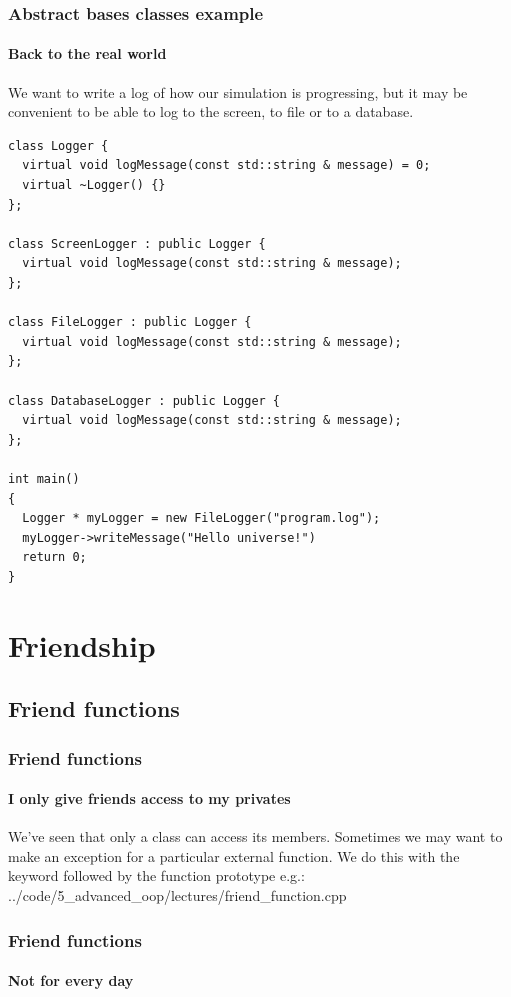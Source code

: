 \documentclass{beamer}
\begin{document}
\begin{frame}[fragile]
  \frametitle{Abstract bases classes example}
  \framesubtitle{Back to the real world}
  We want to write a log of how our simulation is progressing, but it may be convenient to be able to log to the screen, to file or to a database.
  \begin{lstlisting}[basicstyle=\ttfamily\fontsize{7}{8}\selectfont]
class Logger {
  virtual void logMessage(const std::string & message) = 0;
  virtual ~Logger() {}
};

class ScreenLogger : public Logger {
  virtual void logMessage(const std::string & message);
};

class FileLogger : public Logger {
  virtual void logMessage(const std::string & message);
};

class DatabaseLogger : public Logger {
  virtual void logMessage(const std::string & message);
};

int main()
{
  Logger * myLogger = new FileLogger("program.log");
  myLogger->writeMessage("Hello universe!")
  return 0;
}
  \end{lstlisting}

\end{frame}


\section{Friendship}

\subsection{Friend functions}

\begin{frame}[fragile]
  \frametitle{Friend functions}
  \framesubtitle{I only give friends access to my privates}
  
  We've seen that only a class can access its  members.  Sometimes we may want to make an exception for a particular external function.  We do this with the  keyword followed by the function prototype e.g.:
  \pause
    {../code/5_advanced_oop/lectures/friend_function.cpp}

\end{frame}

\begin{frame}[fragile]
  \frametitle{Friend functions}
  \framesubtitle{Not for every day}
  

\end{frame}
\end{document}
